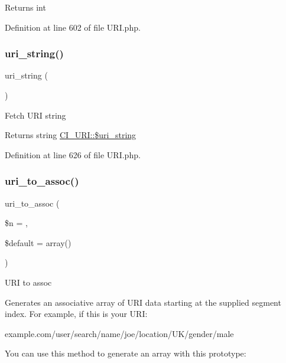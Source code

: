 \begin{DoxyReturn}{Returns}
int 
\end{DoxyReturn}


Definition at line 602 of file U\+R\+I.\+php.

\mbox{\label{class_c_i___u_r_i_ac7a3f945c14cc37f89b6d9d1c7a037a4}} 
\subsubsection{\texorpdfstring{uri\_string()}{uri\_string()}}
{\footnotesize\ttfamily uri\+\_\+string (\begin{DoxyParamCaption}{ }\end{DoxyParamCaption})}

Fetch U\+RI string

\begin{DoxyReturn}{Returns}
string \mbox{\hyperlink{class_c_i___u_r_i_ab908b3e655463a05e8a646c965ca4e53}{C\+I\+\_\+\+U\+R\+I\+::\$uri\+\_\+string}} 
\end{DoxyReturn}


Definition at line 626 of file U\+R\+I.\+php.

\mbox{\label{class_c_i___u_r_i_a67cca74de71898ee88c167a265cff140}} 
\subsubsection{\texorpdfstring{uri\_to\_assoc()}{uri\_to\_assoc()}}
{\footnotesize\ttfamily uri\+\_\+to\+\_\+assoc (\begin{DoxyParamCaption}\item[{}]{\$n = {},  }\item[{}]{\$default = {\ttfamily array()} }\end{DoxyParamCaption})}

U\+RI to assoc

Generates an associative array of U\+RI data starting at the supplied segment index. For example, if this is your U\+RI\+:

example.\+com/user/search/name/joe/location/\+U\+K/gender/male

You can use this method to generate an array with this prototype\+:

